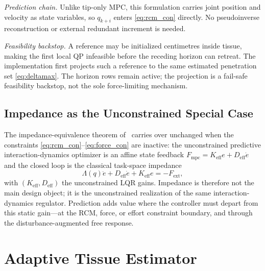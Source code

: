 \emph{Prediction chain.} Unlike tip-only MPC, this formulation carries joint position and velocity as state variables, so $q_{k+i}$ enters \eqref{eq:rcm_con} directly. No pseudoinverse reconstruction or external redundant increment is needed.

\emph{Feasibility backstop.} A reference may be initialized centimetres inside tissue, making the first local QP infeasible before the receding horizon can retreat. The implementation first projects such a reference to the same estimated penetration set \eqref{eq:deltamax}. The horizon rows remain active; the projection is a fail-safe feasibility backstop, not the sole force-limiting mechanism.
\subsection{Impedance as the Unconstrained Special Case}

The impedance-equivalence theorem of~\cite{cao2026phri} carries over unchanged when the constraints \eqref{eq:rcm_con}--\eqref{eq:force_con} are inactive: the unconstrained predictive interaction-dynamics optimizer is an affine state feedback $F_{\text{mpc}} = K_{\text{eff}} e + D_{\text{eff}} \dot{e}$ and the closed loop is the classical task-space impedance~\cite{hogan1985}
\begin{equation}
\Lambda(q) \ddot{e} + D_{\text{eff}} \dot{e} + K_{\text{eff}} e = -F_{\text{ext}},
\label{eq:impedance}
\end{equation}
with $(K_{\text{eff}}, D_{\text{eff}})$ the unconstrained LQR gains. Impedance is therefore not the main design object; it is the unconstrained realization of the same interaction-dynamics regulator. Prediction adds value where the controller must depart from this static gain---at the RCM, force, or effort constraint boundary, and through the disturbance-augmented free response.

\section{Adaptive Tissue Estimator}\label{sec:tissue}

